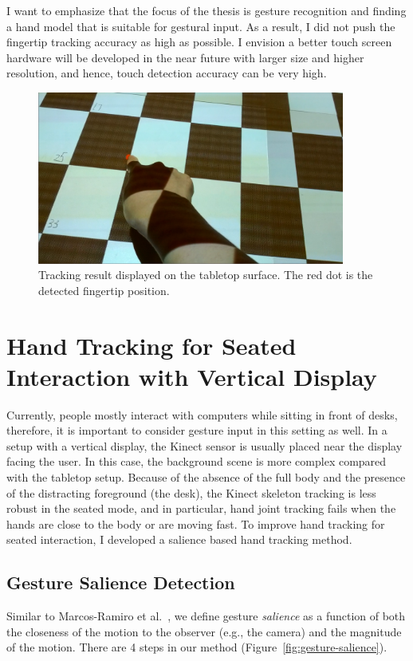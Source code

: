 I want to emphasize that the focus of the thesis is gesture recognition
and finding a hand model that is suitable for gestural input. As a result, I
did not push the fingertip tracking accuracy as high
as possible. I envision a better touch screen hardware will be developed
in the near future with larger size and higher resolution, and hence, touch
detection accuracy can be very high.

\begin{figure}[tbh]
\centering
\includegraphics[width=0.9\textwidth]{figures/checkerboard.PNG}
\caption{Tracking result displayed on the tabletop surface. The red dot is the
detected fingertip position.}
\label{fig:checkerboard}
\end{figure}

\section{Hand Tracking for Seated Interaction with Vertical Display}
Currently, people mostly interact with computers while sitting in front of
desks, therefore, it is important to consider gesture input in this setting as
well. In a setup with a vertical display, the Kinect sensor is usually placed
near the display facing the user. In this case, the background scene is more
complex compared with the tabletop setup. Because of the absence of the full body and the
presence of the distracting foreground (the desk), the Kinect skeleton
tracking is less robust in the seated mode, and in particular, hand joint
tracking fails when the hands are close to the body or are moving fast.
To improve hand tracking for seated interaction, I developed a salience based
hand tracking method.

\subsection{Gesture Salience Detection}
Similar to Marcos-Ramiro et al.~\cite{marcos2013}, we define gesture
\textit{salience} as a function of both the closeness of the motion to the
observer (e.g., the camera) and the magnitude of the motion.
There are 4 steps in our method (Figure~\ref{fig:gesture-salience}).


